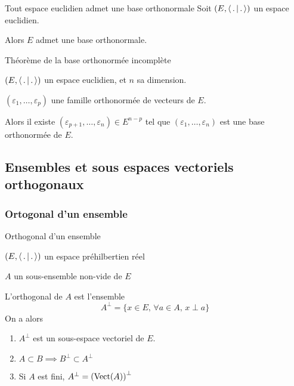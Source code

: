         \begin{coro}{Tout espace euclidien admet une base orthonormale}{}
            Soit $(E,\left<\,.\,\middle|\,.\,\right>)$ un espace euclidien.
    
            Alors $E$ admet une base orthonormale.
        \end{coro}
    
        \begin{coro}{Théorème de la base orthonormée incomplète}{}
            \begin{soient}
                \item $(E,\left<\,.\,\middle|\,.\,\right>)$ un espace euclidien, et $n$ sa dimension.
                \item $(\varepsilon_1,\ldots,\varepsilon_p)$ une famille orthonormée de vecteurs de $E$.
            \end{soient}
            Alors il existe $(\varepsilon_{p+1},\ldots,\varepsilon_n) \in E^{n-p}$ tel que $(\varepsilon_1,\ldots,\varepsilon_n)$ est une base orthonormée de $E$.
        \end{coro}

    \subsection{Ensembles et sous espaces vectoriels orthogonaux}

        \subsubsection{Ortogonal d’un ensemble}

        \begin{defitheo}{Orthogonal d’un ensemble}{}
            \begin{soient}
                \item $(E,\left<\,.\,\middle|\,.\,\right>)$ un espace préhilbertien réel
                \item $A$ un sous-ensemble non-vide de $E$
            \end{soient}
            L’orthogonal de $A$ est l’ensemble 
            \[ A^{\perp} = \{ x \in E, \, \forall a \in A, \, x \perp a \} \]
            On a alors 
            \begin{enumerate}
                \item $A^{\perp}$ est un sous-espace vectoriel de $E$.
                \item $A \subset B \implies B^{\perp} \subset A^{\perp}$
                \item Si $A$ est fini, $A^{\perp} = \left(\operatorname{Vect}(A)\right)^{\perp}$
            \end{enumerate}
        \end{defitheo}

